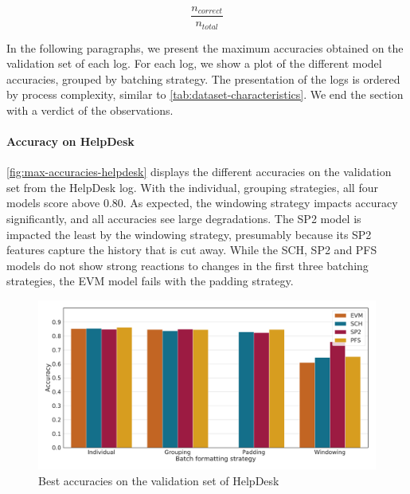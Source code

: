$$\frac{n_{correct}}{n_{total}} $$

In the following paragraphs, we present the maximum accuracies obtained on the validation set of each log.
For each log, we show a plot of the different model accuracies, grouped by batching strategy.
The presentation of the logs is ordered by process complexity, similar to \autoref{tab:dataset-characteristics}.
We end the section with a verdict of the observations.\\

\paragraph{Accuracy on HelpDesk}
\autoref{fig:max-accuracies-helpdesk} displays the different accuracies on the validation set from the HelpDesk log.
With the individual, grouping strategies, all four models score above $0.80$.
As expected, the windowing strategy impacts accuracy significantly, and all accuracies see large degradations.
The SP2 model is impacted the least by the windowing strategy, presumably because its SP2 features capture the history that is cut away.
While the SCH, SP2 and PFS models do not show strong reactions to changes in the first three batching strategies, the EVM model fails with the padding strategy.

\begin{figure}[!htb]
    \centering
    \includegraphics[width=\textwidth]{gfx/helpdesk/accuracies.pdf}
    \caption{Best accuracies on the validation set of HelpDesk}
    \label{fig:max-accuracies-helpdesk}
\end{figure}
\FloatBarrier

